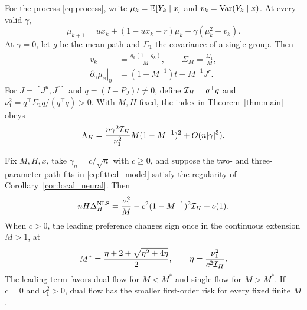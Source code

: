 \begin{theorem}
\label{thm:process}
For the process \eqref{eq:process}, write $\mu_k=\mathbb E[Y_k\mid x]$ and $v_k=\operatorname{Var}(Y_k\mid x)$. At every valid $\gamma$,
\begin{equation}
 \mu_{k+1}=ux_k+(1-ux_k-r)\mu_k
                  +\gamma(\mu_k^2+v_k).
 \label{eq:mean_closure}
\end{equation}
At $\gamma=0$, let $g$ be the mean path and $\Sigma_1$ the covariance of a single group. Then
\begin{equation}
 \begin{aligned}
 v_k&=\frac{g_k(1-g_k)}M,\qquad \Sigma_M=\frac{\Sigma_1}M,\\
 \left.\partial_\gamma\mu_x\right|_0
 &=(1-M^{-1})t-M^{-1}J^r.
 \end{aligned}
 \label{eq:process_identity}
\end{equation}
For $J=[J^u,J^r]$ and $q=(I-P_J)t\ne0$, define $\mathcal I_H=q^\top q$ and $\nu_1^2=q^\top\Sigma_1q/(q^\top q)>0$. With $M,H$ fixed, the index in Theorem~\ref{thm:main} obeys
\begin{equation}
 \Lambda_H
 =\frac{n\gamma^2\mathcal I_H}{\nu_1^2}
      M(1-M^{-1})^2+O(n|\gamma|^3).
 \label{eq:group_lambda}
\end{equation}
\end{theorem}

\begin{corollary}
\label{cor:process}
Fix $M,H,x$, take $\gamma_n=c/\sqrt n$ with $c\ge0$, and suppose the two- and three-parameter path fits in \eqref{eq:fitted_model} satisfy the regularity of Corollary~\ref{cor:local_neural}. Then
\begin{equation}
 nH\Delta_H^{\rm NLS}
 =\frac{\nu_1^2}{M}
    -c^2(1-M^{-1})^2\mathcal I_H+o(1).
 \label{eq:process_nls}
\end{equation}
When $c>0$, the leading preference changes sign once in the continuous extension $M>1$, at
\[
 M^*=\frac{\eta+2+\sqrt{\eta^2+4\eta}}2,\qquad
 \eta=\frac{\nu_1^2}{c^2\mathcal I_H}.
\]
The leading term favors dual flow for $M<M^*$ and single flow for $M>M^*$. If $c=0$ and $\nu_1^2>0$, dual flow has the smaller first-order risk for every fixed finite $M$.
\end{corollary}


